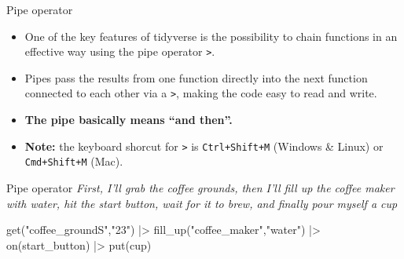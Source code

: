 \documentclass[
  ignorenonframetext,
  aspectratio=169,
]{beamer}
\newenvironment{Shaded}{\begin{snugshade}}{\end{snugshade}}
\newcommand{\FunctionTok}[1]{\textcolor[rgb]{0.28,0.35,0.67}{#1}}
\newcommand{\NormalTok}[1]{\textcolor[rgb]{0.00,0.23,0.31}{#1}}
\newcommand{\SpecialCharTok}[1]{\textcolor[rgb]{0.37,0.37,0.37}{#1}}
\newcommand{\StringTok}[1]{\textcolor[rgb]{0.13,0.47,0.30}{#1}}
\begin{document}
\begin{frame}[fragile]{Pipe operator}
\label{pipe-operator}
\begin{itemize}
\item
  One of the key features of tidyverse is the possibility to chain
  functions in an effective way using the pipe operator
  \texttt{\textbar{}\textgreater{}}.
\item
  Pipes pass the results from one function directly into the next
  function connected to each other via a
  \texttt{\textbar{}\textgreater{}}, making the code easy to read and
  write.
\item
  \textbf{The pipe basically means ``and then''.}
\item
  \textbf{Note:} the keyboard shorcut for
  \texttt{\textbar{}\textgreater{}} is \texttt{Ctrl+Shift+M} (Windows \&
  Linux) or \texttt{Cmd+Shift+M} (Mac).
\end{itemize}
\end{frame}

\begin{frame}[fragile]{Pipe operator}
\label{pipe-operator-1}
\emph{First, I'll grab the coffee grounds, then I'll fill up the coffee
maker with water, hit the start button, wait for it to brew, and finally
pour myself a cup}

\begin{Shaded}
\begin{Highlighting}[]
\FunctionTok{get}\NormalTok{(}\StringTok{"coffee\_groundS"}\NormalTok{,}\StringTok{"23"}\NormalTok{)  }\SpecialCharTok{|\textgreater{}} 
  \FunctionTok{fill\_up}\NormalTok{(}\StringTok{"coffee\_maker"}\NormalTok{,}\StringTok{"water"}\NormalTok{)   }\SpecialCharTok{|\textgreater{}} 
  \FunctionTok{on}\NormalTok{(start\_button)  }\SpecialCharTok{|\textgreater{}} 
  \FunctionTok{put}\NormalTok{(cup)}
\end{Highlighting}
\end{Shaded}
\end{frame}
\end{document}
